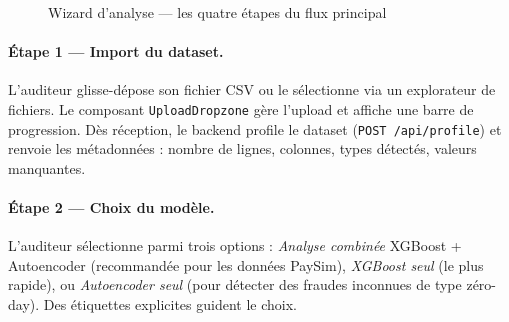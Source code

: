 \documentclass[12pt,a4paper,twoside]{report}
\begin{document}
\begin{figure}[H]
\centering
{}
\caption{Wizard d'analyse --- les quatre étapes du flux principal}
\label{fig:wizard_steps}
\end{figure}

\paragraph{Étape 1 --- Import du dataset.} L'auditeur glisse-dépose son fichier CSV ou le sélectionne via un explorateur de fichiers. Le composant \texttt{UploadDropzone} gère l'upload et affiche une barre de progression. Dès réception, le backend profile le dataset (\texttt{POST /api/profile}) et renvoie les métadonnées : nombre de lignes, colonnes, types détectés, valeurs manquantes.

\paragraph{Étape 2 --- Choix du modèle.} L'auditeur sélectionne parmi trois options : \textit{Analyse combinée} XGBoost + Autoencoder (recommandée pour les données PaySim), \textit{XGBoost seul} (le plus rapide), ou \textit{Autoencoder seul} (pour détecter des fraudes inconnues de type zéro-day). Des étiquettes explicites guident le choix.
\end{document}
